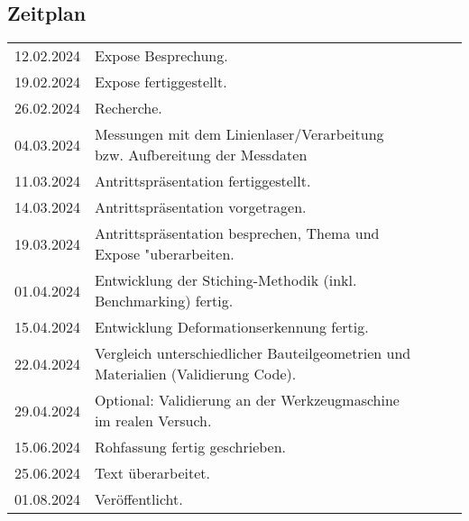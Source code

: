 \documentclass[../main.tex]{subfiles}
\begin{document}
\begin{table}[h]
    \subsection*{Zeitplan}
    \begin{tabular}{lllll}
    \multicolumn{1}{r}{12.02.2024} & Expose Besprechung.                                                          &  &  &  \\
    \multicolumn{1}{r}{19.02.2024} & Expose fertiggestellt.                                                      &  &  &  \\
    \multicolumn{1}{r}{26.02.2024} & Recherche.                               &  &  &  \\
    \multicolumn{1}{r}{04.03.2024} & Messungen mit dem Linienlaser/Verarbeitung bzw. Aufbereitung der Messdaten                          &  &  &  \\
    \multicolumn{1}{r}{11.03.2024} & Antrittspräsentation fertiggestellt.                 &  &  &  \\
    \multicolumn{1}{r}{14.03.2024} & Antrittspräsentation vorgetragen.                                                        &  &  &  \\
    \multicolumn{1}{r}{19.03.2024} & Antrittspräsentation besprechen, Thema und Expose "uberarbeiten.              &  &  &  \\
    \multicolumn{1}{r}{01.04.2024} & Entwicklung der Stiching-Methodik (inkl. Benchmarking) fertig.                    &  &  &  \\
    \multicolumn{1}{r}{15.04.2024} & Entwicklung Deformationserkennung fertig. &  &  &  \\
    \multicolumn{1}{r}{22.04.2024} & Vergleich unterschiedlicher Bauteilgeometrien und Materialien (Validierung Code).&  &  &  \\
    \multicolumn{1}{r}{29.04.2024} & Optional: Validierung an der Werkzeugmaschine im realen Versuch. &  &  &  \\
    \multicolumn{1}{r}{15.06.2024} & Rohfassung fertig geschrieben.                                                        &  &  &  \\
    \multicolumn{1}{r}{25.06.2024} & Text überarbeitet.                                                           &  &  &  \\
    \multicolumn{1}{r}{01.08.2024} & Veröffentlicht.                                                            &  &  & 
    \end{tabular}
\end{table}
\end{document}
